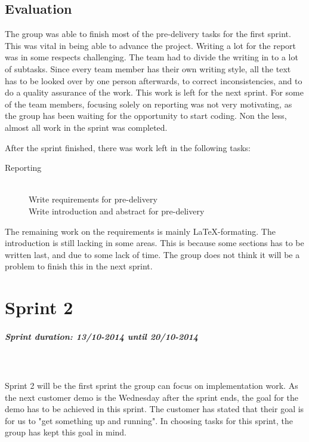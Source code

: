 \documentclass[11pt,a4paper,titlepage,oneside]{report}
\begin{document}
\section{Evaluation}
The group was able to finish most of the pre-delivery tasks for the first sprint. This was vital in being able to advance the project. Writing a lot for the report was in some respects challenging. The team had to divide the writing in to a lot of subtasks. Since every team member has their own writing style, all the text has to be looked over by one person afterwards, to correct inconsistencies, and to do a quality assurance of the work. This work is left for the next sprint. For some of the team members, focusing solely on reporting was not very motivating, as the group has been waiting for the opportunity to start coding. Non the less, almost all work in the sprint was completed.

After the sprint finished, there was work left in the following tasks:

\begin{description}
	\item[Reporting] \hfill \\ 
	Write requirements for pre-delivery \hfill \\
	Write introduction and abstract for pre-delivery \hfill \\
\end{description}

The remaining work on the requirements is mainly \LaTeX-formating. The introduction is still lacking in some areas. This is because some sections has to be written last, and due to some lack of time. The group does not think it will be a problem to finish this in the next sprint. 

\chapter{Sprint 2}
\paragraph{Sprint duration: 13/10-2014 until 20/10-2014} \hfill \\
\\
\noindent
Sprint 2 will be the first sprint the group can focus on implementation work. As the next customer demo is the Wednesday after the sprint ends, the goal for the demo has to be achieved in this sprint. The customer has stated that their goal is for us to "get something up and running". In choosing tasks for this sprint, the group has kept this goal in mind. 
\end{document}
